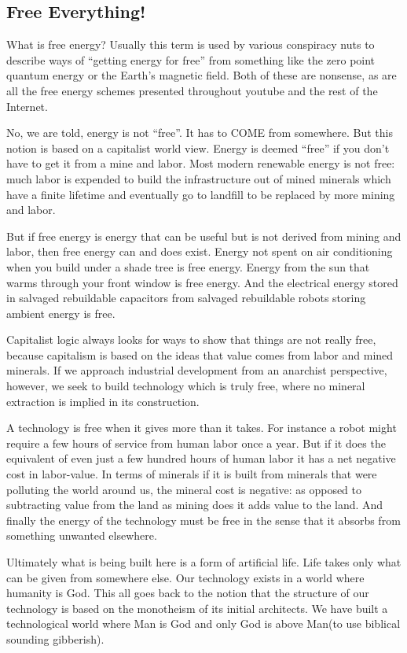 \subsection{Free Everything!}\label{free-everything}

What is free energy? Usually this term is used by various conspiracy
nuts to describe ways of ``getting energy for free'' from something like
the zero point quantum energy or the Earth's magnetic field. Both of
these are nonsense, as are all the free energy schemes presented
throughout youtube and the rest of the Internet.

No, we are told, energy is not ``free''. It has to COME from somewhere.
But this notion is based on a capitalist world view. Energy is deemed
``free'' if you don't have to get it from a mine and labor. Most modern
renewable energy is not free: much labor is expended to build the
infrastructure out of mined minerals which have a finite lifetime and
eventually go to landfill to be replaced by more mining and labor.

But if free energy is energy that can be useful but is not derived from
mining and labor, then free energy can and does exist. Energy not spent
on air conditioning when you build under a shade tree is free energy.
Energy from the sun that warms through your front window is free energy.
And the electrical energy stored in salvaged rebuildable capacitors from
salvaged rebuildable robots storing ambient energy is free.

Capitalist logic always looks for ways to show that things are not
really free, because capitalism is based on the ideas that value comes
from labor and mined minerals. If we approach industrial development
from an anarchist perspective, however, we seek to build technology
which is truly free, where no mineral extraction is implied in its
construction.

A technology is free when it gives more than it takes. For instance a
robot might require a few hours of service from human labor once a year.
But if it does the equivalent of even just a few hundred hours of human
labor it has a net negative cost in labor-value. In terms of minerals if
it is built from minerals that were polluting the world around us, the
mineral cost is negative: as opposed to subtracting value from the land
as mining does it adds value to the land. And finally the energy of the
technology must be free in the sense that it absorbs from something
unwanted elsewhere.

Ultimately what is being built here is a form of artificial life. Life
takes only what can be given from somewhere else. Our technology exists
in a world where humanity is God. This all goes back to the notion that
the structure of our technology is based on the monotheism of its
initial architects. We have built a technological world where Man is God
and only God is above Man(to use biblical sounding gibberish).

